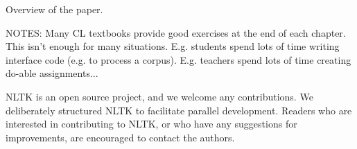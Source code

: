 \documentclass[11pt]{article}
\begin{document}
Overview of the paper.

NOTES: Many CL textbooks provide good exercises at the end of each
chapter.  This isn't enough for many situations.  E.g. students spend
lots of time writing interface code (e.g. to process a corpus).
E.g. teachers spend lots of time creating do-able assignments...

NLTK is an open source project, and we welcome any contributions.  We
deliberately structured NLTK to facilitate parallel development.
Readers who are interested in contributing to NLTK, or who have any
suggestions for improvements, are encouraged to contact the authors.



\end{document}
